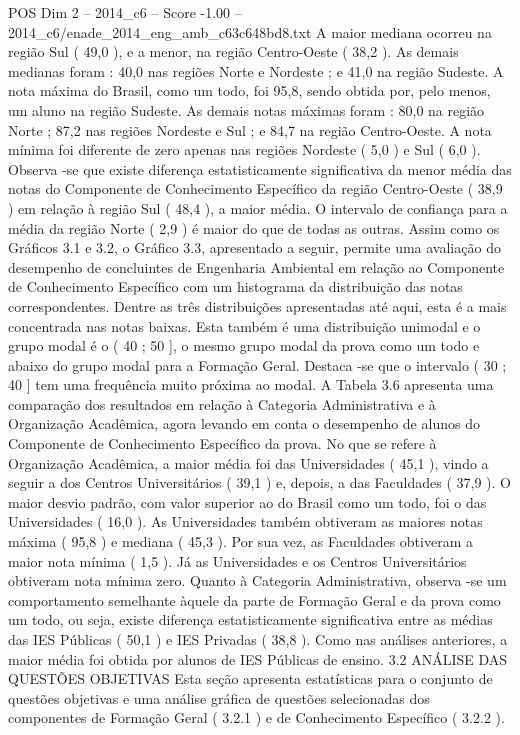 \begin{textsample}{POS Dim 2 – 2014\_c6 – Score -1.00 – 2014\_c6/enade\_2014\_eng\_amb\_c63c648bd8.txt}
A maior mediana ocorreu na região Sul ( 49,0 ), e a menor, na região Centro-Oeste ( 38,2 ).
As demais medianas foram : 40,0 nas regiões Norte e Nordeste ; e 41,0 na região Sudeste.
A nota máxima do Brasil, como um todo, foi 95,8, sendo obtida por, pelo menos, um aluno na região Sudeste.
As demais notas máximas foram : 80,0 na região Norte ; 87,2 nas regiões Nordeste e Sul ; e 84,7 na região Centro-Oeste.
A nota mínima foi diferente de zero apenas nas regiões Nordeste ( 5,0 ) e Sul ( 6,0 ).
Observa -se que existe diferença estatisticamente significativa da menor média das notas do Componente de Conhecimento Específico da região Centro-Oeste ( 38,9 ) em relação à região Sul ( 48,4 ), a maior média.
O intervalo de confiança para a média da região Norte ( 2,9 ) é maior do que de todas as outras.
Assim como os Gráficos 3.1 e 3.2, o Gráfico 3.3, apresentado a seguir, permite uma avaliação do desempenho de concluintes de Engenharia Ambiental em relação ao Componente de Conhecimento Específico com um histograma da distribuição das notas correspondentes.
Dentre as três distribuições apresentadas até aqui, esta é a mais concentrada nas notas baixas.
Esta também é uma distribuição unimodal e o grupo modal é o ( 40 ; 50 ], o mesmo grupo modal da prova como um todo e abaixo do grupo modal para a Formação Geral.
Destaca -se que o intervalo ( 30 ; 40 ] tem uma frequência muito próxima ao modal.
A Tabela 3.6 apresenta uma comparação dos resultados em relação à Categoria Administrativa e à Organização Acadêmica, agora levando em conta o desempenho de alunos do Componente de Conhecimento Específico da prova.
No que se refere à Organização Acadêmica, a maior média foi das Universidades ( 45,1 ), vindo a seguir a dos Centros Universitários ( 39,1 ) e, depois, a das Faculdades ( 37,9 ).
O maior desvio padrão, com valor superior ao do Brasil como um todo, foi o das Universidades ( 16,0 ).
As Universidades também obtiveram as maiores notas máxima ( 95,8 ) e mediana ( 45,3 ).
Por sua vez, as Faculdades obtiveram a maior nota mínima ( 1,5 ).
Já as Universidades e os Centros Universitários obtiveram nota mínima zero.
Quanto à Categoria Administrativa, observa -se um comportamento semelhante àquele da parte de Formação Geral e da prova como um todo, ou seja, existe diferença estatisticamente significativa entre as médias das IES Públicas ( 50,1 ) e IES Privadas ( 38,8 ).
Como nas análises anteriores, a maior média foi obtida por alunos de IES Públicas de ensino. 3.2 ANÁLISE DAS QUESTÕES OBJETIVAS Esta seção apresenta estatísticas para o conjunto de questões objetivas e uma análise gráfica de questões selecionadas dos componentes de Formação Geral ( 3.2.1 ) e de Conhecimento Específico ( 3.2.2 ).

\end{textsample}
